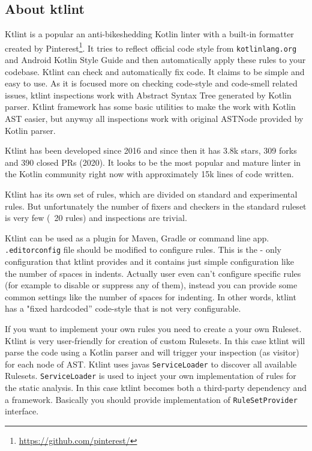 \subsection{About ktlint}
Ktlint is a popular an anti-bikeshedding Kotlin linter with a built-in formatter created by Pinterest\footnote{\url{https://github.com/pinterest/}}. It tries to reflect official code style from \texttt{kotlinlang.org} and Android Kotlin Style Guide and then automatically apply these rules to your codebase. Ktlint can check and automatically fix code. It claims to be simple and easy to use. As it is focused more on checking code-style and code-smell related issues, ktlint inspections work with Abstract Syntax Tree generated by Kotlin parser. Ktlint framework has some basic utilities to make the work with Kotlin AST easier, but anyway all inspections work with original ASTNode provided by Kotlin parser.

Ktlint has been developed since 2016 and since then it has 3.8k stars, 309 forks and 390 closed PRs (2020). It looks to be the most popular and mature linter in the Kotlin community right now with approximately 15k lines of code written.

Ktlint has its own set of rules, which are divided on standard and experimental rules. But unfortunately the number of fixers and checkers in the standard ruleset is very few (~20 rules) and inspections are trivial.

Ktlint can be used as a plugin for Maven, Gradle or command line app. \texttt{.editorconfig} file should be modified to configure rules. This is the - only configuration that ktlint provides and it contains just simple configuration like the number of spaces in indents. Actually user even can’t configure specific rules (for example to disable or suppress any of them), instead you can provide some common settings like the number of spaces for indenting. In other words, ktlint has a "fixed hardcoded” code-style that is not very configurable.

If you want to implement your own rules you need to create a your own Ruleset. Ktlint is very user-friendly for creation of custom Rulesets. In this case ktlint will parse the code using a Kotlin parser and will trigger your inspection (as visitor) for each node of AST. Ktlint uses javas \texttt{ServiceLoader} to discover all available Rulesets. \texttt{ServiceLoader} is used to inject your own implementation of rules for the static analysis. In this case ktlint becomes both a third-party dependency and a framework. Basically you should provide implementation of \texttt{RuleSetProvider} interface.

